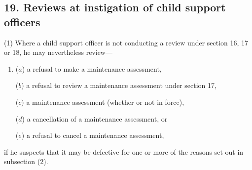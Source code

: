 \documentclass[12pt,a4paper]{article}
\begin{document}
%
%
%
%
%
%

\subsection{19. Reviews at instigation of child support officers}

(1) Where a child support officer is not conducting a review under section 16, 17 or 18, he may nevertheless review—
\begin{enumerate}\item[]
($a$) a refusal to make a maintenance assessment,

($b$) a refusal to review a maintenance assessment under section 17,

($c$) a maintenance assessment (whether or not in force),

($d$) a cancellation of a maintenance assessment, or

($e$) a refusal to cancel a maintenance assessment,
\end{enumerate}
if he suspects that it may be defective for one or more of the reasons set out in subsection (2).
\end{document}
